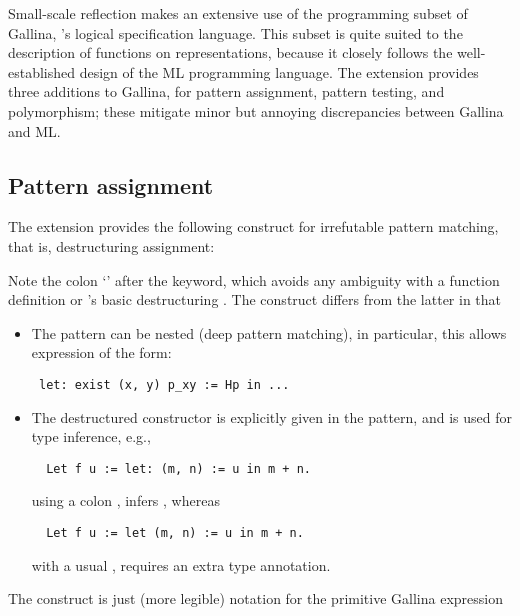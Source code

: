 Small-scale reflection makes an extensive use of the programming
subset of Gallina, \Coq{}'s logical specification language. This subset
is quite suited to the description of functions on representations,
because it closely follows the well-established design of the ML
programming language. The \ssr{} extension provides three additions
to Gallina, for pattern assignment, pattern testing, and polymorphism;
these mitigate minor but annoying discrepancies between Gallina and ML.

\subsection{Pattern assignment}\label{ssec:patass}
The \ssr{} extension provides the following construct for
irrefutable pattern matching, that is, destructuring assignment:

   \ssrC{:=}   

Note the colon `\ssrC{:}' after the  keyword, which avoids any
ambiguity with a function
definition or \Coq{}'s basic destructuring . The 
construct differs from the latter in that
\begin{itemize}
\item The pattern can be nested (deep pattern matching), in
  particular, this allows expression of the form:
\begin{lstlisting}
 let: exist (x, y) p_xy := Hp in ...
\end{lstlisting}
\item The destructured constructor is explicitly given in the
  pattern, and is used for type inference, e.g.,
\begin{lstlisting}
  Let f u := let: (m, n) := u in m + n.
\end{lstlisting}
using a colon , infers , whereas
\begin{lstlisting}
  Let f u := let (m, n) := u in m + n.
\end{lstlisting}
with a usual , requires an extra type annotation.
\end{itemize}
The  construct is just (more legible) notation for the primitive Gallina expression

\begin{center}
    \ssrC{=>}  
\end{center}

